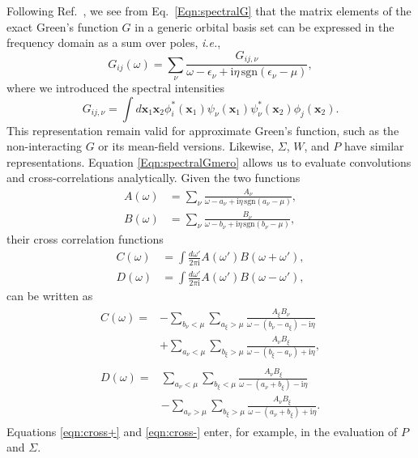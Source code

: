 \documentclass[aps,prb,reprint,superscriptaddress]{revtex4-1}
\newcommand{\bx}{\boldsymbol{x}}
\newcommand{\eps}{\epsilon}
\newcommand{\ie}{\textit{i.e.}}
\newcommand{\I}{\text{i}}
\begin{document}
Following Ref.~\citep{vonFriesen_2010}, we see from Eq.~\ref{Eqn:spectralG} that the matrix elements of the exact Green's function $G$ in a generic orbital basis set can be expressed in the frequency domain as a sum over poles, \ie,
\begin{equation}
\label{Eqn:spectralGmero}
	G_{ij}(\omega) = \sum_\nu \frac{ G_{ij,\nu} }{ \omega - \eps_\nu + \I \eta \, \text{sgn}(\eps_\nu - \mu ) },
\end{equation}
where we introduced the spectral intensities
\begin{equation}
G_{ij,\nu}=\int d\bx_1 \bx_2 \phi^*_i(\bx_1) \psi_\nu(\bx_1) \psi^*_\nu(\bx_2) \phi_j(\bx_2).
\end{equation}
This representation remain valid for approximate Green's function, such as the non-interacting $G$ or its mean-field versions.
Likewise, $\Sigma$, $W$, and $P$ have similar representations.
Equation \eqref{Eqn:spectralGmero} allows us to evaluate convolutions and cross-correlations analytically.
Given the two functions 
\begin{subequations}
\begin{align}
\label{Eqn:spectralAmero}
	A(\omega) & = \sum_\nu \frac{ A_\nu }{ \omega - a_\nu + \I \eta \, \text{sgn}(a_\nu - \mu ) },
	\\
\label{Eqn:spectralBmero}
	B(\omega) & = \sum_\nu \frac{ B_\nu }{ \omega - b_\nu + \I \eta \, \text{sgn}(b_\nu - \mu ) },
\end{align}
\end{subequations}
their cross correlation functions
\begin{subequations}
\begin{align}
    C(\omega) & =\int \frac{d\omega'}{2\pi \I} A(\omega')B(\omega+\omega'),
    \label{eqn:cross+}
    \\
    D(\omega)& = \int \frac{d\omega'}{2\pi \I} A(\omega')B(\omega-\omega'),
    \label{eqn:cross-}
\end{align}
\end{subequations}
can be written as
\begin{align}
\begin{split}
    C(\omega) 
     =& -\sum_{b_\nu<\mu}\sum_{a_\xi>\mu} \frac{ A_\xi B_\nu}{ \omega - (b_\nu-a_\xi) - \I \eta }
    \\
    & + \sum_{a_\nu<\mu}\sum_{b_\xi>\mu} \frac{ A_\nu B_\xi}{ \omega - (b_\xi-a_\nu) + \I \eta },
\end{split}
    \\
\begin{split}
    D(\omega)
     =& \sum_{a_\nu<\mu}\sum_{b_\xi<\mu} \frac{ A_\nu B_\xi}{ \omega - (a_\nu+b_\xi) - \I \eta }
    \\
    & -\sum_{a_\nu>\mu}\sum_{b_\xi>\mu} \frac{ A_\nu B_\xi}{ \omega - (a_\nu+b_\xi) + \I \eta }.
\end{split}
\end{align}
Equations \eqref{eqn:cross+} and \eqref{eqn:cross-} enter, for example, in the evaluation of $P$ and $\Sigma$.
\end{document}
